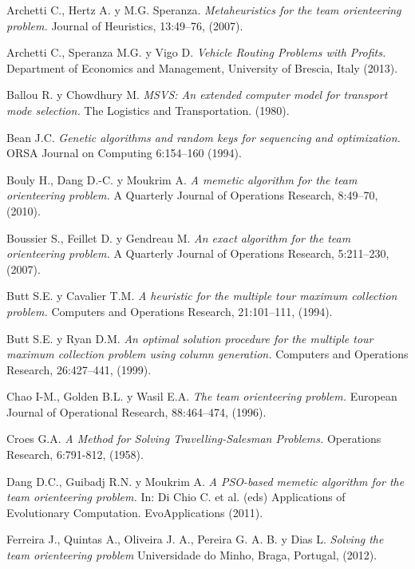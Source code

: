 \renewcommand\bibname{References}
\begin{thebibliography}{9}

Archetti C., Hertz A. y M.G. Speranza.
\textit{Metaheuristics for the team orienteering problem.} 
Journal of Heuristics, 13:49–76, (2007).

Archetti C., Speranza M.G. y Vigo D.
\textit{Vehicle Routing Problems with Profits.} 
Department of Economics and Management, University of Brescia, Italy (2013).

Ballou R. y Chowdhury M.
\textit{MSVS: An extended computer model for transport mode selection.} The Logistics and Transportation. (1980).

Bean J.C.
\textit{Genetic algorithms and random keys for sequencing and optimization.}
ORSA Journal on Computing 6:154–160 (1994).

Bouly H., Dang D.-C. y Moukrim A.
\textit{A memetic algorithm for the team orienteering problem.}
A Quarterly Journal of Operations Research, 8:49–70, (2010).

Boussier S., Feillet D. y Gendreau M.
\textit{An exact algorithm for the team orienteering problem.}
A Quarterly Journal of Operations Research, 5:211–230, (2007).

Butt S.E. y Cavalier T.M.
\textit{A heuristic for the multiple tour maximum collection problem.}
Computers and Operations Research, 21:101–111, (1994).

Butt S.E. y Ryan D.M. 
\textit{An optimal solution procedure for the multiple tour maximum collection problem using column generation.}
Computers and Operations Research, 26:427–441, (1999).

Chao I-M., Golden B.L. y Wasil E.A.
\textit{The team orienteering problem.}
European Journal of Operational Research, 88:464–474, (1996).

Croes G.A.
\textit{A Method for Solving Travelling-Salesman Problems.}
Operations Research, 6:791-812, (1958).

Dang D.C., Guibadj R.N. y Moukrim A.
\textit{A PSO-based memetic algorithm for the team orienteering problem.}
In: Di Chio C. et al. (eds) Applications of Evolutionary Computation. EvoApplications (2011).

Ferreira J., Quintas A., Oliveira J. A., Pereira G. A. B. y Dias L.
\textit{Solving the team orienteering problem}
Universidade do Minho, Braga, Portugal, (2012).


\end{thebibliography}
